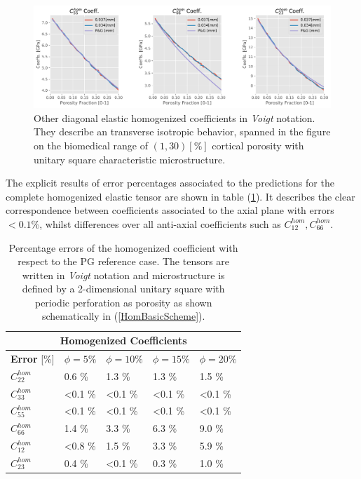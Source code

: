 \begin{figure}[!h]
	\centering
	\includegraphics[scale=.5]{images/CellsProb/CellProb_OthersHomCoeffsCircular.pdf}
	\caption{Other diagonal elastic homogenized coefficients in \textit{Voigt} notation. They describe an transverse isotropic behavior, spanned in the figure on the biomedical range of $(1,30) [\%]$ cortical porosity with unitary square characteristic microstructure.}
	\label{OtherHomCoeffsSquare}
\end{figure}

The explicit results of error percentages associated to the predictions for the complete homogenized elastic tensor are shown in table (\ref{HomCoeffSquareTable}). It describes the clear correspondence between coefficients associated to the axial plane with errors $< 0.1\%$, whilst differences over all anti-axial coefficients such as $C_{12}^{hom}, C_{66}^{hom}$.
\begin{table}[!h]
\centering
    \begin{tabular}{ |p{2.2cm}||p{2cm}|p{2cm}|p{2cm}|p{2cm}| }
    \hline
    \multicolumn{5}{|c|}{\textbf{Homogenized Coefficients}} \\
    \hline
    \textbf{Error} [\%] & $\phi = 5 \%$ & $\phi = 10 \%$ & $\phi = 15 \%$ & $\phi = 20 \%$ \\
    \hline
    $C^{hom}_{22}$ & 0.6 \% & 1.3 \% & 1.3 \% & 1.5 \% \\
    $C^{hom}_{33}$ & <0.1 \% & <0.1 \% & <0.1 \% & <0.1 \% \\
    $C^{hom}_{55}$ & <0.1 \% & <0.1 \% & <0.1 \% & <0.1 \% \\
    $C^{hom}_{66}$ & 1.4 \% & 3.3 \% & 6.3 \% & 9.0 \% \\
    $C^{hom}_{12}$ & <0.8 \% & 1.5 \% & 3.3 \% & 5.9 \% \\
    $C^{hom}_{23}$ & 0.4 \% & <0.1 \% & 0.3 \% & 1.0 \% \\
    \hline
    \end{tabular}
    \caption{Percentage errors of the homogenized coefficient with respect to the PG reference case. The tensors are written in \textit{Voigt} notation and microstructure is defined by a 2-dimensional unitary square with periodic perforation as porosity as shown schematically in (\ref{HomBasicScheme}).}
    \label{HomCoeffSquareTable}
\end{table}

